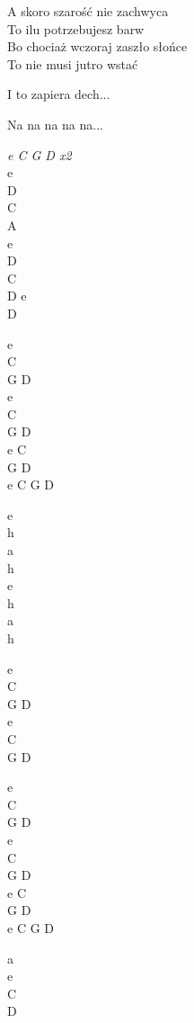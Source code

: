 \begin{text}
    A skoro szarość nie zachwyca\\
    To ilu potrzebujesz barw\\
    Bo chociaż wczoraj zaszło słońce\\
    To nie musi jutro wstać

    \vin I to zapiera dech...
    
    Na na na na na...
\end{text}
\begin{chord}
    \textit{e C G D x2}\\
    e\\
    D\\
    C\\
    A\\
    e\\
    D\\
    C\\
    D e\\
    D

    e\\
    C\\
    G D\\
    e\\
    C\\
    G D\\
    e C\\
    G D\\
    e C G D

    e\\
    h\\
    a\\
    h\\
    e\\
    h\\
    a\\
    h

    e\\
    C\\
    G D\\
    e\\
    C\\
    G D

    e\\
    C\\
    G D\\
    e\\
    C\\
    G D\\
    e C\\
    G D\\
    e C G D

    a\\
    e\\
    C\\
    D
\end{chord}